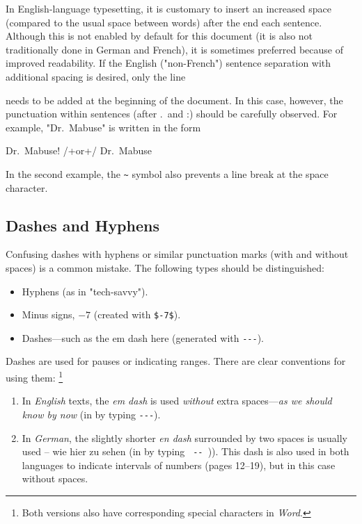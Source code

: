 In English-language typesetting, it is customary to insert an increased space
(compared to the usual space between words) after the end each sentence.
Although this is not enabled by default for this document (it is also not
traditionally done in German and French), it is sometimes preferred because of
improved readability. If the English ("non-French") sentence separation with
additional spacing is desired, only the line
%
\begin{LaTeXCode}[numbers=none]
\nonfrenchspacing
\end{LaTeXCode}
%
needs to be added at the beginning of the document. In this case, however, the
punctuation within sentences (after .\ and :) should be carefully observed. For
example, "Dr.\ Mabuse" is written in the form
%
\begin{LaTeXCode}[numbers=none]
Dr.\ Mabuse! /+\quad\textrm{or}\quad+/ Dr.~Mabuse
\end{LaTeXCode}
%
In the second example, the \verb!~! symbol also prevents a line break at the
space character.

\subsection{Dashes and Hyphens}
\label{sec:dash}

Confusing dashes with hyphens or similar punctuation marks (with and without
spaces) is a common mistake. The following types should be distinguished:
%
\begin{itemize}
    \item Hyphens (as in "tech-savvy").
    \item Minus signs, \eg $-7$ (created with \verb!$-7$!).
    \item Dashes---such as the em dash here (generated with \verb!---!).
\end{itemize}
%
\noindent
Dashes are used for pauses or indicating ranges. There are clear conventions
for using them:%
\footnote{Both versions also have corresponding special characters in
\emph{Word}.}
%
\begin{enumerate}
	\item In \emph{English} texts, the \emph{em dash} is used \emph{without}
	extra spaces---\emph{as we should know by now} (in \latex by typing
	{\verb*!---!}).
	\item In \emph{German}, the slightly shorter \emph{en dash} surrounded by
	two spaces is usually used -- wie hier zu sehen (in \latex by typing
	{\verb*! -- !})). This dash is also used in both languages to indicate
	intervals of numbers (pages 12--19), but in this case without spaces.
\end{enumerate}


